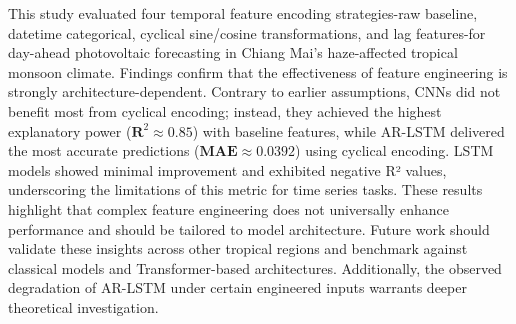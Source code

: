 \documentclass[conference]{IEEEtran}
\begin{document}
	This study evaluated four temporal feature encoding strategies-raw baseline, datetime categorical, cyclical sine/cosine transformations, and lag features-for day-ahead photovoltaic forecasting in Chiang Mai’s haze-affected tropical monsoon climate. Findings confirm that the effectiveness of feature engineering is strongly architecture-dependent. Contrary to earlier assumptions, CNNs did not benefit most from cyclical encoding; instead, they achieved the highest explanatory power ($\mathbf{R}^{2} \approx 0.85$) with baseline features, while AR-LSTM delivered the most accurate predictions ($\mathbf{MAE} \approx 0.0392$) using cyclical encoding. LSTM models showed minimal improvement and exhibited negative R² values, underscoring the limitations of this metric for time series tasks. These results highlight that complex feature engineering does not universally enhance performance and should be tailored to model architecture. Future work should validate these insights across other tropical regions and benchmark against classical models and Transformer-based architectures. Additionally, the observed degradation of AR-LSTM under certain engineered inputs warrants deeper theoretical investigation.
	
	
	
	
	
\end{document}
